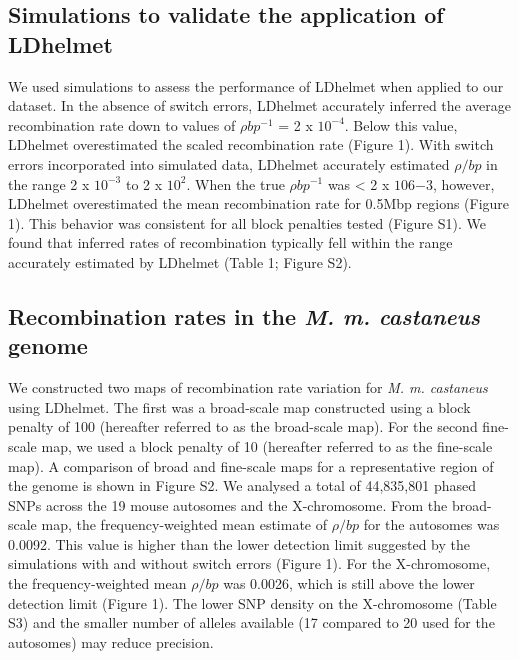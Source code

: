 \subsection{Simulations to validate the application of LDhelmet}

We used simulations to assess the performance of LDhelmet when applied to our dataset. In the absence of switch errors, LDhelmet accurately inferred the average recombination rate down to values of $\rho bp^{-1}$ = 2 x $10^{-4}$. Below this value, LDhelmet overestimated the scaled recombination rate (Figure 1). With switch errors incorporated into simulated data, LDhelmet accurately estimated $\rho /bp$ in the range 2 x $10^{-3}$ to 2 x $10^2$. When the true $\rho bp^{-1}$ was < 2 x $106{-3}$, however, LDhelmet overestimated the mean recombination rate for 0.5Mbp regions (Figure 1). This behavior was consistent for all block penalties tested (Figure S1). We found that inferred rates of recombination typically fell within the range accurately estimated by LDhelmet (Table 1; Figure S2).
 
\subsection{Recombination rates in the \textit{\textit{M. m. castaneus}} genome}
 
We constructed two maps of recombination rate variation for \textit{M. m. castaneus} using LDhelmet. The first was a broad-scale map constructed using a block penalty of 100 (hereafter referred to as the broad-scale map). For the second fine-scale map, we used a block penalty of 10 (hereafter referred to as the fine-scale map). A comparison of broad and fine-scale maps for a representative region of the genome is shown in Figure S2. We analysed a total of 44,835,801 phased SNPs across the 19 mouse autosomes and the X-chromosome. From the broad-scale map, the frequency-weighted mean estimate of $\rho /bp$ for the autosomes was 0.0092. This value is higher than the lower detection limit suggested by the simulations with and without switch errors (Figure 1). For the X-chromosome, the frequency-weighted mean $\rho /bp$ was 0.0026, which is still above the lower detection limit (Figure 1). The lower SNP density on the X-chromosome (Table S3) and the smaller number of alleles available (17 compared to 20 used for the autosomes) may reduce precision. 
 
